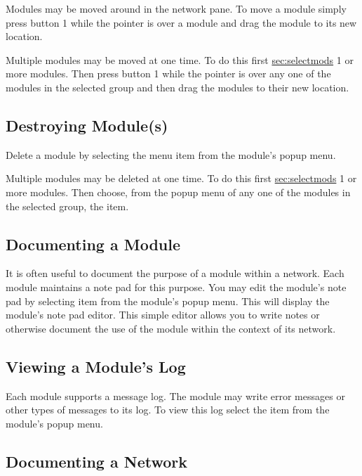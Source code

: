 Modules may be moved around in the network pane.  To move a module simply
press button 1 while the pointer is over a module and drag the module to
its new location.

Multiple modules may be moved at one time.  To do this first
\hyperref{select}{select (see Section~}{)}{sec:selectmods} 1 or more
modules. Then press button 1 while the pointer is over any one of the
modules in the selected group and then drag the modules to their new location.


\subsection{Destroying Module(s)}
\label{sec:destroymod}

Delete a module by selecting the  menu item from the
module's popup menu.

Multiple modules may be deleted at one time.  To do this first
\hyperref{select}{select (see Section~}{)}{sec:selectmods} 1 or more
modules. Then choose, from the popup menu of any one of the modules in the
selected group, the  item.


\subsection{Documenting a Module}
\label{sec:docmodule}

It is often useful to document the purpose of a module within a network.
Each module maintains a note pad for this purpose.  You may edit the
module's note pad by selecting  item from the module's
popup menu.  This will display the module's note pad editor.  This simple
editor allows you to write notes or otherwise document the use of the
module within the context of its network.

\subsection{Viewing a Module's Log}
\label{sec:viewmodslog}

Each module supports a message log.  The module may write error messages or
other types of messages to its log.  To view this log select the
 item from the module's popup menu.

\subsection{Documenting a Network}
\label{sec:docnetwork}

